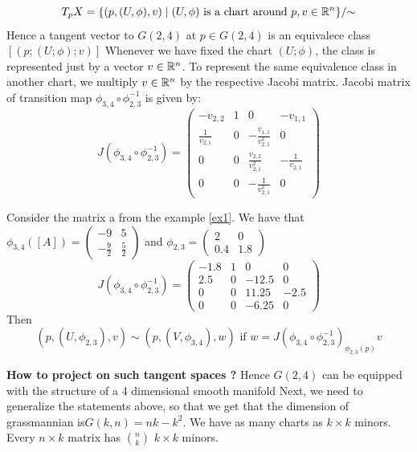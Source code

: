 \documentclass[11pt,a4paper]{report}
\begin{document}
$$ T_p X = \{ (p,(U,\phi),v) \;|\; (U,\phi) \text{ is a chart around } p, v \in \mathbb{R}^n \}/{\sim} $$
Hence a tangent vector to $G(2,4)$ at $p \in G(2,4)$ is an equivalece class $ [ (p; (U; \phi); v)] $  
Whenever we have fixed the chart $(U; \phi)$, the class is represented just by a vector $v \in \mathbb{R}^n$.
To represent the same equivalence class in another chart, we multiply $v \in \mathbb{R}^n$ by the respective Jacobi matrix.
\newline
Jacobi matrix of transition map $\phi_{3,4} \circ \phi_{2,3}^{-1}$ is given by:
$$ J(\phi_{3,4} \circ \phi_{2,3}^{-1}) = 
\begin{pmatrix} 
    -v_{2,2} & 1 & 0 & -v_{1,1} \\
    \frac{1}{v_{2,1}} & 0 & -\frac{v_{1,1}}{v_{2,1}^2} & 0 \\
    0 & 0 & \frac{v_{2,2}}{v_{2,1}^2} & -\frac{1}{v_{2,1}} \\
    0 & 0 & -\frac{1}{v_{2,1}^2} & 0 
\end{pmatrix} $$
\begin{Ex}\label{tangentSpaces}
Consider the matrix a from the example \ref{ex1}. 
We have that $\phi_{3,4}([A]) = \begin{pmatrix} -9 & 5 \\ -\frac{9}{2} & \frac{5}{2} \end{pmatrix}$ and   
$\phi_{2,3} = \begin{pmatrix} 2 & 0 \\ 0.4 & 1.8 \end{pmatrix}$
$$ J(\phi_{3,4} \circ \phi_{2,3}^{-1}) =
\begin{pmatrix} 
    -1.8 & 1 & 0 & 0 \\
    2.5 & 0 & -12.5 & 0 \\
    0 & 0 & 11.25 & -2.5 \\
    0 & 0 & -6.25 & 0
\end{pmatrix} $$
Then 
$$ (p, (U,\phi_{2,3}), v) \sim (p, (V, \phi_{3,4}), w) \text{ if } w = J( \phi_{3,4} \circ \phi_{2,3}^{-1})_{\phi_{2,3}(p)} v $$
\end{Ex}
\textbf{How to project on such tangent spaces ?}
Hence $G(2,4)$ can be equipped with the structure of a 4 dimensional smooth manifold
\newline
Next, we need to generalize the statements above, so that we get that the dimension of grassmannian is$ G(k,n) = n k-k^2$.
We have as many charts as $k \times k$ minors. Every $ n \times k$ matrix has ${n \choose k}$ $k\times k$ minors.
\end{document}
